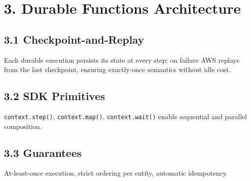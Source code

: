 \section*{3. Durable Functions Architecture}
\subsection*{3.1 Checkpoint-and-Replay}
Each durable execution persists its state at every step; on failure AWS replays from the last checkpoint, ensuring exactly-once semantics without idle cost.

\subsection*{3.2 SDK Primitives}
\texttt{context.step()}, \texttt{context.map()}, \texttt{context.wait()} enable sequential and parallel composition.

\subsection*{3.3 Guarantees}
At-least-once execution, strict ordering per entity, automatic idempotency.
